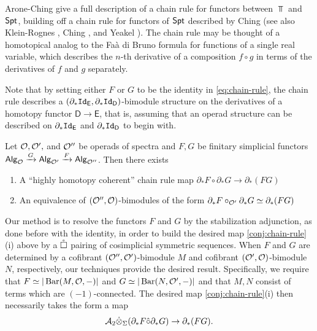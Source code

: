 Arone-Ching \cite{AC-1} give a full description of a chain rule for functors between $\Top$ and $\mathsf{Spt}$, building off a chain rule for functors of $\mathsf{Spt}$ described by Ching \cite{Ching-chain-rule} (see also Klein-Rognes \cite{Klein-Rog}, Ching \cite{Ching-chain-rule}, and Yeakel \cite{Yeak}). The chain rule may be thought of a homotopical analog to the Fa\`a di Bruno formula \cite{Faa} for functions of a single real variable, which describes the $n$-th derivative of a composition $f\circ g$ in terms of the derivatives of $f$ and $g$ separately. 

Note that by setting either $F$ or $G$ to be the identity in \eqref{eq:chain-rule}, the chain rule describes a $(\partial_*\mathtt{Id}_{\mathsf{E}},\partial_*\mathtt{Id}_{\mathsf{D}})$-bimodule structure on the derivatives of a homotopy functor $\mathsf{D}\to\mathsf{E}$, that is, assuming that an operad structure can be described on $\partial_*\mathtt{Id}_{\mathsf{E}}$ and $\partial_*\mathtt{Id}_{\mathsf{D}}$ to begin with.

\begin{conjecture} \label{conj:chain-rule}
    Let $\mathcal{O},\mathcal{O}',$ and $\mathcal{O}''$ be operads of spectra and $F,G$ be finitary simplicial functors ${\mathsf{Alg}_{\mathcal{O}}}\xrightarrow{G} {\mathsf{Alg}_{\mathcal{O'}}} \xrightarrow{F} {\mathsf{Alg}_{\mathcal{O''}}}$. Then there exists \begin{enumerate}[label=(\roman*)]
        \item A ``highly homotopy coherent'' chain rule map $\partial_*F\circ \partial_*G\to \partial_*(FG)$ 
        \item An equivalence of $(\mathcal{O}'', \mathcal{O})$-bimodules of the form $\partial_*F\circ_{\mathcal{O}'} \partial_*G\simeq \partial_*(FG)$
    \end{enumerate}
\end{conjecture}

Our method is to resolve the functors $F$ and $G$ by the stabilization adjunction, as done before with the identity, in order to build the desired map \ref{conj:chain-rule}(i) above by a $\mathring{\square}$ pairing of cosimplicial symmetric sequences. When $F$ and $G$ are determined by a cofibrant $(\mathcal{O}'',\mathcal{O}')$-bimodule $M$ and cofibrant $(\mathcal{O}',\mathcal{O})$-bimodule $N$, respectively, our techniques provide the desired result. Specifically, we require that $F\simeq  |\operatorname{Bar}(M,\mathcal{O},-)|$ and $G\simeq |\operatorname{Bar}(N,\mathcal{O}',-)|$ and that $M,N$ consist of terms which are $(-1)$-connected. The desired map \ref{conj:chain-rule}(i) then necessarily takes the form a map \[\mathcal{A}_2 \dot{\otimes}_{\Sigma} (\partial_* F \hat{\circ} \partial_* G) \to \partial_*(FG).\]

